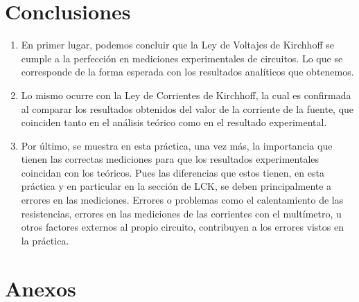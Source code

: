 \documentclass{article}
\begin{document}
    \section{Conclusiones}

    \begin{enumerate}
        \item En primer lugar, podemos concluir que la Ley de Voltajes de Kirchhoff se cumple a la perfección en mediciones experimentales de circuitos. Lo que se corresponde de la forma esperada con los resultados analíticos que obtenemos.
        \item Lo mismo ocurre con la Ley de Corrientes de Kirchhoff, la cual es confirmada al comparar los resultados obtenidos del valor de la corriente de la fuente, que coinciden tanto en el análisis teórico como en el resultado experimental.
        \item Por último, se muestra en esta práctica, una vez más, la importancia que tienen las correctas mediciones para que los resultados experimentales coincidan con los teóricos. Pues las diferencias que estos tienen, en esta práctica y en particular en la sección de LCK, se deben principalmente a errores en las mediciones. Errores o problemas como el calentamiento de las resistencias, errores en las mediciones de las corrientes con el multímetro, u otros factores externos al propio circuito, contribuyen a los errores vistos en la práctica.
    \end{enumerate}

    \nocite{*}
    \printbibliography{}

    \section{Anexos}

\end{document}
